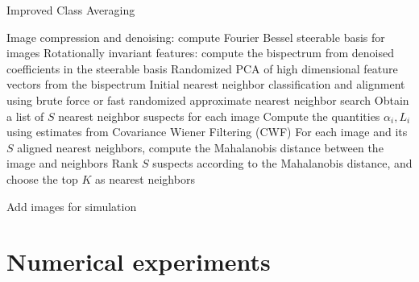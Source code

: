\documentclass{article}
\begin{document}
\begin{algorithm}
\caption{Improved Class Averaging }
\label{alg:classav}
\begin{algorithmic}[1]
\State Image compression and denoising: compute Fourier Bessel steerable basis for images \cite{ffbspca}
\State Rotationally invariant features: compute the bispectrum from denoised coefficients in the steerable basis
\State Randomized PCA\cite{rokhlin} of high dimensional feature vectors from the bispectrum
\State Initial nearest neighbor classification and alignment using brute force or fast randomized approximate nearest neighbor search \cite{fastnn}
\State Obtain a list of $S$ nearest neighbor suspects for each image
\EndProcedure
{}
\State Compute the quantities $\alpha_i, L_i$ using estimates from Covariance Wiener Filtering (CWF) \cite{cwf}
\State For each image and its $S$ aligned nearest neighbors, compute the Mahalanobis distance between the image and neighbors
\State Rank $S$ suspects according to the Mahalanobis distance, and choose the top $K$ as nearest neighbors
\EndProcedure
{}
\EndProcedure
\end{algorithmic}
\end{algorithm}

{\color{red} Add images for simulation}
\section{Numerical experiments}
\label{sec:num}
\end{document}
